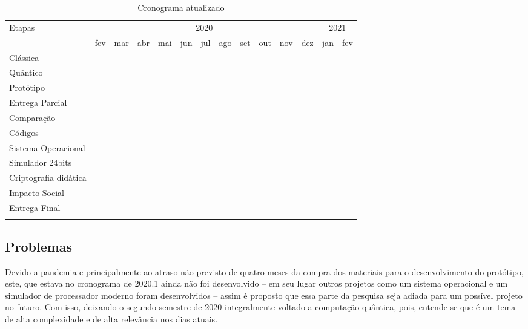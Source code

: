 \vspace{1cm}
\begin{longtable}{ |p{2.5cm}||p{0.60cm}|p{0.60cm}|p{0.60cm}|p{0.60cm}|p{0.60cm}|p{0.60cm}|p{0.60cm}|p{0.60cm}|p{0.60cm}|p{0.60cm}|p{0.60cm}|p{0.60cm}|p{0.60cm}|  }
  \hline
  \multirow{2}{*}{Etapas} & 
  \multicolumn{11}{|c|}{2020} & 
  \multicolumn{2}{|c|}{2021} \\
        &
    fev &
    mar &
    abr &
    mai &
    jun &
    jul &
    ago &
    set &
    out &
    nov &
    dez &
    jan &
    fev \\
  \hline
  Clássica & &
  \multicolumn{6}{|c|}{\cellcolor{green!25}} & 
  & & & & & \\
  \hline
  Quântico & &
  \multicolumn{1}{|c|}{\cellcolor{green!25}} & 
  & & & &
  \multicolumn{6}{|c|}{\cellcolor{blue!25}} & 
  \\
  \hline
  Protótipo & & & & &
  \multicolumn{1}{|c|}{\cellcolor{green!25}} & 
  & & & & & & & \\
  \hline
  Entrega Parcial & & & &
  \multicolumn{5}{|c|}{\cellcolor{green!25}} & 
  & & & & \\
  \hline
  Comparação & & & & & & & & &
  \multicolumn{2}{|c|}{\cellcolor{blue!25}} & 
  & & \\
  \hline
  Códigos & &
  \multicolumn{5}{|c|}{\cellcolor{green!25}} & 
  \multicolumn{6}{|c|}{\cellcolor{blue!25}} & 
  \\
  \hline
  Sistema Operacional & & &
  \multicolumn{5}{|c|}{\cellcolor{green!25}} & 
  & & & & & 
  \\
  \hline
  Simulador 24bits & & &
  \multicolumn{5}{|c|}{\cellcolor{green!25}} & 
  & & & & & 
  \\
  \hline
  Criptografia didática & & & & &
  \multicolumn{2}{|c|}{\cellcolor{green!25}} & 
  \multicolumn{3}{|c|}{\cellcolor{blue!25}} & 
  & & &
  \\
  \hline
  Impacto Social & & & & & &
  \multicolumn{2}{|c|}{\cellcolor{green!25}} & 
  & &
  \multicolumn{2}{|c|}{\cellcolor{blue!25}} & 
  & \\
  \hline
  Entrega Final & & & & & & &
  \multicolumn{7}{|c|}{\cellcolor{blue!25}} \\
  \hline
  \caption{Cronograma atualizado}
  \label{table:6}
\end{longtable}
\vspace{1cm}

\subsection{Problemas}
\label{problems}
Devido a pandemia e principalmente ao atraso não previsto de quatro meses da compra dos materiais para o desenvolvimento do protótipo, este, que estava no cronograma de 2020.1 ainda não foi desenvolvido – em seu lugar outros projetos como um sistema operacional e um simulador de processador moderno foram desenvolvidos – assim é proposto que essa parte da pesquisa seja adiada para um possível projeto no futuro. Com isso, deixando o segundo semestre de 2020 integralmente voltado a computação quântica, pois, entende-se que é um tema de alta complexidade e de alta relevância nos dias atuais.

\newpage